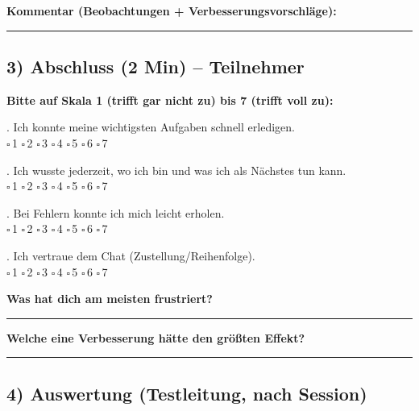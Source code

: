 \noindent\textbf{Kommentar (Beobachtungen + Verbesserungsvorschläge):}

\vspace{2cm}
\noindent\rule{\textwidth}{0.4pt}

\subsection*{3) Abschluss (2 Min) – Teilnehmer}

\noindent\textbf{Bitte auf Skala 1 (trifft gar nicht zu) bis 7 (trifft voll zu):}

\bigskip
{}. Ich konnte meine wichtigsten Aufgaben schnell erledigen. \\
$\square$\,1 \quad $\square$\,2 \quad $\square$\,3 \quad $\square$\,4 \quad $\square$\,5 \quad $\square$\,6 \quad $\square$\,7

\bigskip
{}. Ich wusste jederzeit, wo ich bin und was ich als Nächstes tun kann. \\
$\square$\,1 \quad $\square$\,2 \quad $\square$\,3 \quad $\square$\,4 \quad $\square$\,5 \quad $\square$\,6 \quad $\square$\,7

\bigskip
{}. Bei Fehlern konnte ich mich leicht erholen. \\
$\square$\,1 \quad $\square$\,2 \quad $\square$\,3 \quad $\square$\,4 \quad $\square$\,5 \quad $\square$\,6 \quad $\square$\,7

\bigskip
{}. Ich vertraue dem Chat (Zustellung/Reihenfolge). \\
$\square$\,1 \quad $\square$\,2 \quad $\square$\,3 \quad $\square$\,4 \quad $\square$\,5 \quad $\square$\,6 \quad $\square$\,7

\bigskip
\noindent\textbf{Was hat dich am meisten frustriert?} \\
\vspace{2cm}
\noindent\rule{\textwidth}{0.4pt}

\bigskip
\noindent\textbf{Welche eine Verbesserung hätte den größten Effekt?} \\
\vspace{2cm}
\noindent\rule{\textwidth}{0.4pt}

\subsection*{4) Auswertung (Testleitung, nach Session)}

